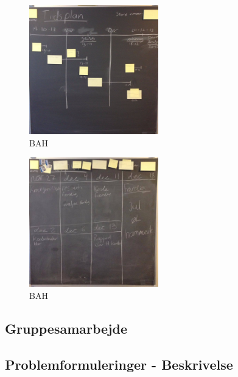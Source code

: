 \documentclass[a4paper,12pt,oneside,article]{memoir}
\begin{document}
            \begin{figure}[ht!]
                \centering
                \includegraphics[width=0.5\textwidth]{Images/9.jpg}
                \caption{BAH}
                \label{4}
            \end{figure}

            \begin{figure}[ht!]
                \centering
                \includegraphics[width=0.5\textwidth]{Images/2.jpg}
                \caption{BAH}
                \label{4}
            \end{figure}

\subsection{Gruppesamarbejde}



        \subsection{Problemformuleringer - Beskrivelse}
\end{document}
